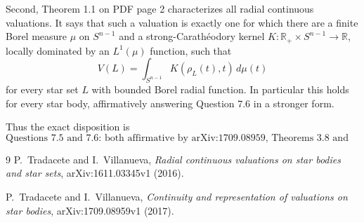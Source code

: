 \documentclass[11pt]{article}
\newcommand{\R}{\mathbb R}
\begin{document}
Second, Theorem 1.1 on PDF page 2 characterizes all radial continuous
valuations.  It says that such a valuation is exactly one for which there are
a finite Borel measure $\mu$ on $S^{n-1}$ and a strong-Carath\'eodory kernel
$K:\R_+\times S^{n-1}\to\R$, locally dominated by an $L^1(\mu)$ function,
such that
\[
 V(L)=\int_{S^{n-1}}K(\rho_L(t),t)\,d\mu(t)
\]
for every star set $L$ with bounded Borel radial function.  In particular this
holds for every star body, affirmatively answering Question 7.6 in a stronger
form.

Thus the exact disposition is
\[
 \boxed{\text{Questions 7.5 and 7.6: both affirmative by
 arXiv:1709.08959, Theorems 3.8 and 1.1.}}
\]

\begin{thebibliography}{9}
P.~Tradacete and I.~Villanueva,
\emph{Radial continuous valuations on star bodies and star sets},
arXiv:1611.03345v1 (2016).

P.~Tradacete and I.~Villanueva,
\emph{Continuity and representation of valuations on star bodies},
arXiv:1709.08959v1 (2017).
\end{thebibliography}
\end{document}
